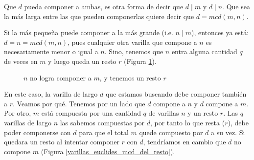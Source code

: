 \documentclass[12pt, a4paper, openany, fleqn]{book}
\begin{document}
    Que $d$ pueda componer a ambas, es otra forma de decir que $d \mid m$ y $d \mid n$. Que sea la más larga entre las que pueden componerlas quiere decir que $d = mcd(m,n)$.

    Si la más pequeña puede componer a la más grande (i.e. $n \mid m$), entonces ya está: $d=n=mcd(m,n)$, pues cualquier otra varilla que compone a $n$ es necesariamente menor o igual a $n$. Sino, tenemos que $n$ entra alguna cantidad $q$ de veces en $m$ y luego queda un resto $r$ (Figura \ref{varillas_euclides_resto}).

    \begin{figure}[h]
        \centering
        \caption{$n$ no logra componer a $m$, y tenemos un resto $r$} \label{varillas_euclides_resto}
    \end{figure}


    En este caso, la varilla de largo $d$ que estamos buscando debe componer también a $r$. Veamos por qué. Tenemos por un lado que $d$ compone a $n$ y $d$ compone a $m$. Por otro, $m$ está compuesta por una cantidad $q$ de varillas $n$ y un resto $r$.
    Las $q$ varillas de largo $n$ las sabemos compuestas por $d$, por tanto lo que resta ($r$), debe poder componerse con $d$ para que el total $m$ quede compuesto por $d$ a su vez. Si quedara un resto al intentar componer $r$ con $d$, tendríamos en cambio que $d$ no compone $m$ (Figura \ref{varillas_euclides_mcd_del_resto}).
\end{document}
